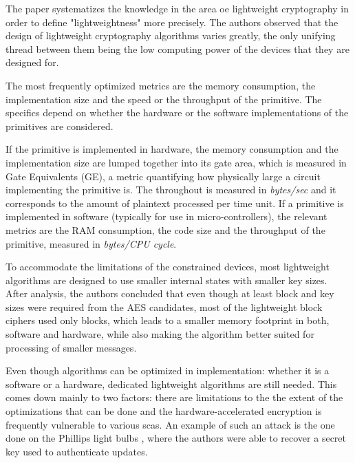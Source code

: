 \documentclass{llncs}
\begin{document}
The paper systematizes the knowledge in the area oe lightweight cryptography
in order to define "lightweightness" more precisely. The authors observed that the design
of lightweight cryptography algorithms varies greatly, the only unifying thread
between them being the low computing power of the devices that they are designed for.

The most frequently optimized metrics are the memory consumption, the implementation size
and the speed or the throughput of the primitive. The specifics depend on whether
the hardware or the software implementations of the primitives are considered.

If the primitive is implemented in hardware, the memory consumption and the implementation
size are lumped together into its gate area, which is measured in Gate Equivalents (GE),
a metric quantifying how physically large a circuit implementing the primitive is.
The throughout is measured in \textit{bytes/sec} and it corresponds to the amount of plaintext
processed per time unit. If a primitive is implemented in software (typically for
use in micro-controllers), the relevant metrics are the RAM consumption, the code
size and the throughput of the primitive, measured in \textit{bytes/CPU cycle}.

To accommodate the limitations of the constrained devices, most lightweight algorithms
are designed to use smaller internal states with smaller key sizes. After analysis,
the authors concluded that even though at least  block and
key sizes were required from the AES candidates, most of the lightweight
block ciphers used only  blocks, which leads to a smaller memory
footprint in both, software and hardware, while also making the algorithm better suited
for processing of smaller messages.

Even though algorithms can be optimized in implementation: whether it is
a software or a hardware, dedicated lightweight algorithms are still needed.
This comes down mainly to two factors: there are limitations to the the extent of
the optimizations that can be done and the hardware-accelerated encryption is
frequently vulnerable to various \gls{sca}s. An example of such an attack is the one done on the
Phillips light bulbs \cite{cryptoeprint:2016:1047}, where the authors were able to
recover a secret key used to authenticate updates.
\end{document}
